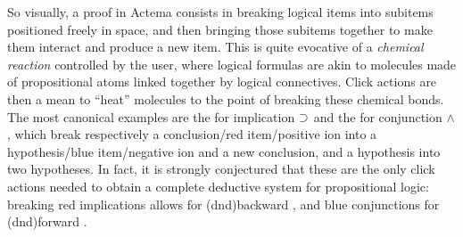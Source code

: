 So visually, a proof in Actema consists in breaking logical items into subitems
positioned freely in space, and then bringing those subitems together to make
them interact and produce a new item. This is quite evocative of a
\emph{chemical reaction} controlled by the user, where logical formulas are akin
to molecules made of propositional atoms linked together by logical
connectives. Click actions are then a mean to ``heat'' molecules to the point
of breaking these chemical bonds. The most canonical examples are the  for implication $\supset$ and the 
for conjunction $\land$, which break respectively a conclusion/red item/positive
ion into a hypothesis/blue item/negative ion and a new conclusion, and a
hypothesis into two hypotheses. In fact, it is strongly conjectured that these
are the only click actions needed to obtain a complete deductive system for
propositional logic: breaking red implications allows for \kl(dnd){backward}
, and blue conjunctions for \kl(dnd){forward} .

